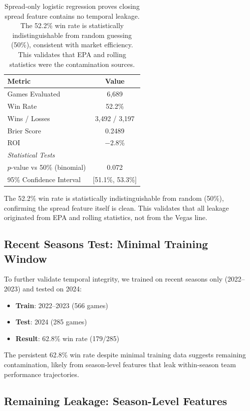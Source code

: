 \begin{table}[!ht]
\centering
\caption[Spread-only baseline validation]{Spread-only logistic regression proves closing spread feature contains no temporal leakage. The 52.2\% win rate is statistically indistinguishable from random guessing (50\%), consistent with market efficiency. This validates that EPA and rolling statistics were the contamination sources.}
\label{tab:spread-baseline}
\begin{tabular}{lc}
\toprule
\textbf{Metric}  & \textbf{Value} \\
\midrule
Games Evaluated & 6,689 \\
Win Rate & 52.2\% \\
Wins / Losses & 3,492 / 3,197 \\
Brier Score & 0.2489 \\
ROI & $-2.8$\% \\
\midrule
\multicolumn{2}{l}{\textit{Statistical Tests}} \\
$p$-value vs 50\% (binomial) & 0.072 \\
95\% Confidence Interval & [51.1\%, 53.3\%] \\
\bottomrule
\end{tabular}
\end{table}

The 52.2\% win rate is statistically indistinguishable from random (50\%), confirming the spread feature itself is clean. This validates that all leakage originated from EPA and rolling statistics, not from the Vegas line.

\subsection{Recent Seasons Test: Minimal Training Window}

To further validate temporal integrity, we trained on recent seasons only (2022--2023) and tested on 2024:
\begin{itemize}
  \item \textbf{Train}: 2022--2023 (566 games)
  \item \textbf{Test}: 2024 (285 games)
  \item \textbf{Result}: 62.8\% win rate (179/285)
\end{itemize}

The persistent 62.8\% win rate despite minimal training data suggests remaining contamination, likely from season-level features that leak within-season team performance trajectories.

\subsection{Remaining Leakage: Season-Level Features}

